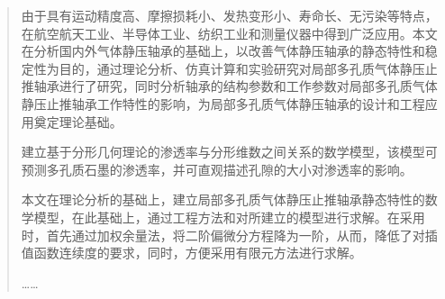 %

\begin{abstract}
由于具有运动精度高、摩擦损耗小、发热变形小、寿命长、无污染等特点，在航空航天工业、半导体工业、纺织工业和测量仪器中得到广泛应用。本文在分析国内外气体静压轴承的基础上，以改善气体静压轴承的静态特性和稳定性为目的，通过理论分析、仿真计算和实验研究对局部多孔质气体静压止推轴承进行了研究，同时分析轴承的结构参数和工作参数对局部多孔质气体静压止推轴承工作特性的影响，为局部多孔质气体静压轴承的设计和工程应用奠定理论基础。

建立基于分形几何理论的渗透率与分形维数之间关系的数学模型，该模型可预测多孔质石墨的渗透率，并可直观描述孔隙的大小对渗透率的影响。

本文在理论分析的基础上，建立局部多孔质气体静压止推轴承静态特性的数学模型，在此基础上，通过工程方法和对所建立的模型进行求解。在采用时，首先通过加权余量法，将二阶偏微分方程降为一阶，从而，降低了对插值函数连续度的要求，同时，方便采用有限元方法进行求解。

……
\end{abstract}


